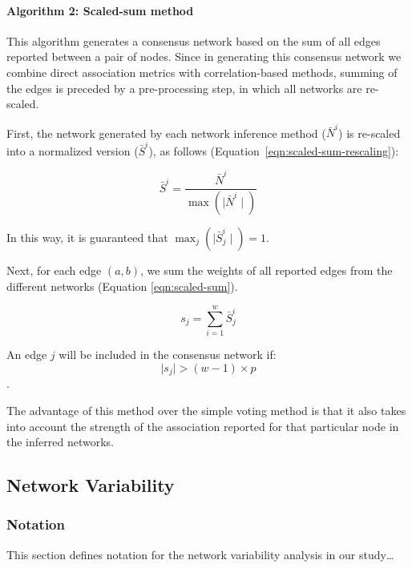   \paragraph*{Algorithm 2: Scaled-sum method}

  This algorithm generates a consensus network based on the sum of all edges reported between a pair of nodes. Since in generating this consensus network we combine direct association metrics with correlation-based methods, summing of the edges is preceded by a pre-processing step, in which all networks are re-scaled.

  First, the network generated by each network inference method ($\bar{N}^i$) is re-scaled into a normalized version ($\bar{S}^i$), as follows  (Equation~\ref{eqn:scaled-sum-rescaling}):


  \begin{equation}
    \bar{S}^{i} = \frac{\bar{N}^{i}}{\max(\mid \bar{N}^{i} \mid)}
    \label{eqn:scaled-sum-rescaling}
  \end{equation}

    In this way, it is guaranteed that $\max_{j}(\mid \bar{S}^i_j \mid) = 1$.


  Next, for each edge $(a,b)$, we sum the weights of all reported edges from the different networks (Equation \ref{eqn:scaled-sum}).

  \begin{equation}
    s_j = \sum_{i=1}^{w} \bar{S}^i_j
    \label{eqn:scaled-sum}
  \end{equation}


  An edge $j$ will be included in the consensus network if:
  \begin{equation}
    \mid s_j \mid > (w - 1) \times p
    \label{eq:scaled-sum2}
  \end{equation}.

  The advantage of this method over the simple voting method is that it also takes into account the strength of the association reported for that particular node in the inferred networks.

  \subsection*{Network Variability}
  \vspace{-5mm}


  \subsubsection*{Notation}
  \vspace{-5mm}
  This section defines notation for the network variability analysis in our study\dots

